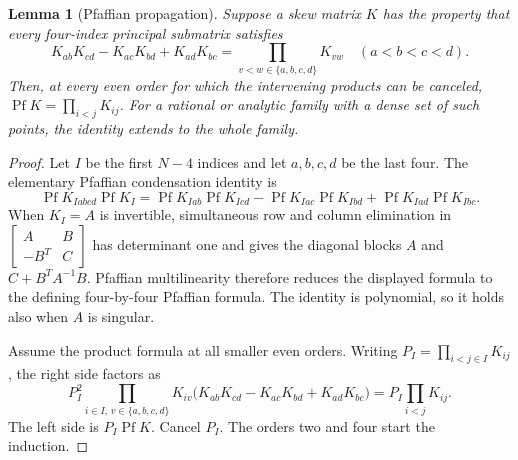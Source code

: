 \documentclass[11pt]{article}
\numberwithin{equation}{section}
\newtheorem{lemma}[theorem]{Lemma}
\theoremstyle{remark}\newtheorem{remark}[theorem]{Remark}
\begin{document}
\begin{lemma}[Pfaffian propagation]\label{lem:pf-propagation}
Suppose a skew matrix $K$ has the property that every four-index
principal submatrix satisfies
\[
 K_{ab}K_{cd}-K_{ac}K_{bd}+K_{ad}K_{bc}
   =\prod_{v<w\in\{a,b,c,d\}}K_{vw}
 \quad(a<b<c<d).
\]
Then, at every even order for which the intervening products
can be canceled, $\operatorname{Pf}K=\prod_{i<j}K_{ij}$.
For a rational or analytic family with a dense set of such
points, the identity extends to the whole family.
\end{lemma}
\begin{proof}
Let $I$ be the first $N-4$ indices and let $a,b,c,d$ be the last
four.  The elementary Pfaffian condensation identity is
\[
 \operatorname{Pf}K_{Iabcd}\operatorname{Pf}K_I
 =\operatorname{Pf}K_{Iab}\operatorname{Pf}K_{Icd}
  -\operatorname{Pf}K_{Iac}\operatorname{Pf}K_{Ibd}
  +\operatorname{Pf}K_{Iad}\operatorname{Pf}K_{Ibc}.
\]
When $K_I=A$ is invertible, simultaneous
row and column elimination in
$\left[\begin{smallmatrix}A&B\\-B^T&C\end{smallmatrix}\right]$
has determinant one and gives the diagonal blocks
$A$ and $C+B^TA^{-1}B$.  Pfaffian multilinearity therefore
reduces the displayed formula to the defining four-by-four
Pfaffian formula.  The identity is polynomial, so it holds
also when $A$ is singular.

Assume the product formula at all smaller even orders.
Writing $P_I=\prod_{i<j\in I}K_{ij}$, the right side factors as
\[
 P_I^2\prod_{i\in I,\,v\in\{a,b,c,d\}}K_{iv}
 \bigl(K_{ab}K_{cd}-K_{ac}K_{bd}+K_{ad}K_{bc}\bigr)
 =P_I\prod_{i<j}K_{ij}.
\]
The left side is $P_I\operatorname{Pf}K$.  Cancel $P_I$.
The orders two and four start the induction.
\end{proof}
\end{document}

